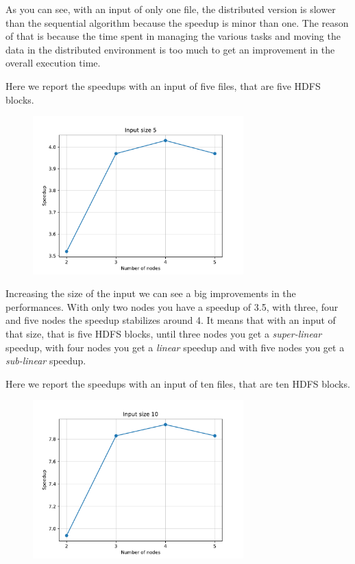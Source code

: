 \documentclass[10pt,twocolumn,letterpaper]{article}
\begin{document}
As you can see, with an input of only one file, the distributed version is slower than the sequential algorithm because the speedup is minor than one. The reason of that is because the time spent in managing the various tasks and moving the data in the distributed environment is too much to get an improvement in the overall execution time.

Here we report the speedups with an input of five files, that are five HDFS blocks.

\begin{figure}[H]
\centering
\includegraphics[width=3.2in]{fig/speedup5}
\end{figure}

Increasing the size of the input we can see a big improvements in the performances. With only two nodes you have a speedup of 3.5, with three, four and five nodes the speedup stabilizes around 4. It means that with an input of that size, that is five HDFS blocks, until three nodes you get a \textit{super-linear} speedup, with four nodes you get a \textit{linear} speedup and with five nodes you get a \textit{sub-linear} speedup.

Here we report the speedups with an input of ten files, that are ten HDFS blocks.

\begin{figure}[H]
\centering
\includegraphics[width=3.2in]{fig/speedup10}
\end{figure}
\end{document}
